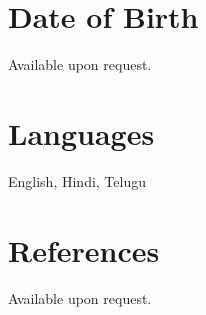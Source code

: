 \documentclass[11pt,margin,line]{res}
\begin{document}
\begin{resume}
\section{\sc Date of Birth}
Available upon request.

\section{\sc Languages}
English, Hindi, Telugu

\section{\sc References}
Available upon request.



\end{resume}
\end{document}
